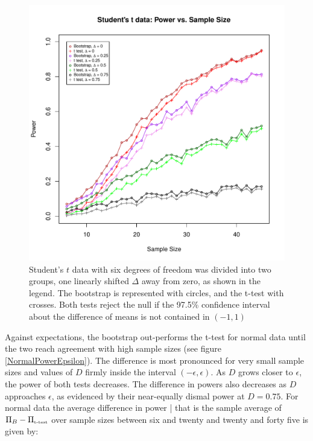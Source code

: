 \begin{figure}[h!]

\includegraphics{Student'sTPowerEpsilon.pdf}

\caption{Student's $t$ data with six degrees of freedom was divided into two groups, one linearly shifted $\Delta$ away from zero, as shown in the legend. The bootstrap is represented with circles, and the t-test with crosses. Both tests reject the null if the 97.5\% confidence interval about the difference of means is not contained in $(-1, 1)$}
\end{figure}

\pagebreak

Against expectations, the bootstrap out-performs the t-test for normal data until the two reach agreement with high sample sizes (see figure \ref{NormalPowerEpsilon}). The difference is most pronounced for very small sample sizes and values of $D$ firmly inside the interval $( -\epsilon, \epsilon)$. As $D$ grows closer to $\epsilon$, the power of both tests decreases. The difference in powers also decreases as $D$ approaches $\epsilon$, as evidenced by their near-equally dismal power at $D = 0.75$. For normal data the average difference in power | that is the sample average of $\Pi_B - \Pi_{\mbox{\tiny{t-test}}}$ over sample sizes between six and twenty and twenty and forty five is given by:

